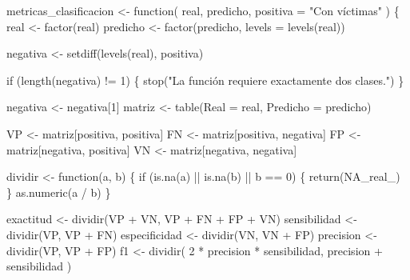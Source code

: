 \documentclass[
  spanish,
  10.5pt,
  letterpaper,
  openany,
  headings=big]{scrbook}
\newenvironment{Shaded}{}{}
\newcommand{\AttributeTok}[1]{\textcolor[rgb]{0.84,0.23,0.29}{#1}}
\newcommand{\ConstantTok}[1]{\textcolor[rgb]{0.00,0.36,0.77}{#1}}
\newcommand{\ControlFlowTok}[1]{\textcolor[rgb]{0.84,0.23,0.29}{#1}}
\newcommand{\DecValTok}[1]{\textcolor[rgb]{0.00,0.36,0.77}{#1}}
\newcommand{\FunctionTok}[1]{\textcolor[rgb]{0.44,0.26,0.76}{#1}}
\newcommand{\NormalTok}[1]{\textcolor[rgb]{0.14,0.16,0.18}{#1}}
\newcommand{\OtherTok}[1]{\textcolor[rgb]{0.44,0.26,0.76}{#1}}
\newcommand{\SpecialCharTok}[1]{\textcolor[rgb]{0.00,0.36,0.77}{#1}}
\newcommand{\StringTok}[1]{\textcolor[rgb]{0.01,0.18,0.38}{#1}}
\begin{document}
\begin{Shaded}
\begin{Highlighting}[]
\NormalTok{metricas\_clasificacion }\OtherTok{\textless{}{-}} \ControlFlowTok{function}\NormalTok{(}
\NormalTok{  real,}
\NormalTok{  predicho,}
  \AttributeTok{positiva =} \StringTok{"Con víctimas"}
\NormalTok{) \{}
\NormalTok{  real }\OtherTok{\textless{}{-}} \FunctionTok{factor}\NormalTok{(real)}
\NormalTok{  predicho }\OtherTok{\textless{}{-}} \FunctionTok{factor}\NormalTok{(predicho, }\AttributeTok{levels =} \FunctionTok{levels}\NormalTok{(real))}

\NormalTok{  negativa }\OtherTok{\textless{}{-}} \FunctionTok{setdiff}\NormalTok{(}\FunctionTok{levels}\NormalTok{(real), positiva)}

  \ControlFlowTok{if}\NormalTok{ (}\FunctionTok{length}\NormalTok{(negativa) }\SpecialCharTok{!=} \DecValTok{1}\NormalTok{) \{}
    \FunctionTok{stop}\NormalTok{(}\StringTok{"La función requiere exactamente dos clases."}\NormalTok{)}
\NormalTok{  \}}

\NormalTok{  negativa }\OtherTok{\textless{}{-}}\NormalTok{ negativa[}\DecValTok{1}\NormalTok{]}
\NormalTok{  matriz }\OtherTok{\textless{}{-}} \FunctionTok{table}\NormalTok{(}\AttributeTok{Real =}\NormalTok{ real, }\AttributeTok{Predicho =}\NormalTok{ predicho)}

\NormalTok{  VP }\OtherTok{\textless{}{-}}\NormalTok{ matriz[positiva, positiva]}
\NormalTok{  FN }\OtherTok{\textless{}{-}}\NormalTok{ matriz[positiva, negativa]}
\NormalTok{  FP }\OtherTok{\textless{}{-}}\NormalTok{ matriz[negativa, positiva]}
\NormalTok{  VN }\OtherTok{\textless{}{-}}\NormalTok{ matriz[negativa, negativa]}

\NormalTok{  dividir }\OtherTok{\textless{}{-}} \ControlFlowTok{function}\NormalTok{(a, b) \{}
    \ControlFlowTok{if}\NormalTok{ (}\FunctionTok{is.na}\NormalTok{(a) }\SpecialCharTok{||} \FunctionTok{is.na}\NormalTok{(b) }\SpecialCharTok{||}\NormalTok{ b }\SpecialCharTok{==} \DecValTok{0}\NormalTok{) \{}
      \FunctionTok{return}\NormalTok{(}\ConstantTok{NA\_real\_}\NormalTok{)}
\NormalTok{    \}}
    \FunctionTok{as.numeric}\NormalTok{(a }\SpecialCharTok{/}\NormalTok{ b)}
\NormalTok{  \}}

\NormalTok{  exactitud }\OtherTok{\textless{}{-}} \FunctionTok{dividir}\NormalTok{(VP }\SpecialCharTok{+}\NormalTok{ VN, VP }\SpecialCharTok{+}\NormalTok{ FN }\SpecialCharTok{+}\NormalTok{ FP }\SpecialCharTok{+}\NormalTok{ VN)}
\NormalTok{  sensibilidad }\OtherTok{\textless{}{-}} \FunctionTok{dividir}\NormalTok{(VP, VP }\SpecialCharTok{+}\NormalTok{ FN)}
\NormalTok{  especificidad }\OtherTok{\textless{}{-}} \FunctionTok{dividir}\NormalTok{(VN, VN }\SpecialCharTok{+}\NormalTok{ FP)}
\NormalTok{  precision }\OtherTok{\textless{}{-}} \FunctionTok{dividir}\NormalTok{(VP, VP }\SpecialCharTok{+}\NormalTok{ FP)}
\NormalTok{  f1 }\OtherTok{\textless{}{-}} \FunctionTok{dividir}\NormalTok{(}
    \DecValTok{2} \SpecialCharTok{*}\NormalTok{ precision }\SpecialCharTok{*}\NormalTok{ sensibilidad,}
\NormalTok{    precision }\SpecialCharTok{+}\NormalTok{ sensibilidad}
\NormalTok{  )}


\end{Highlighting}
\end{Shaded}
\end{document}
